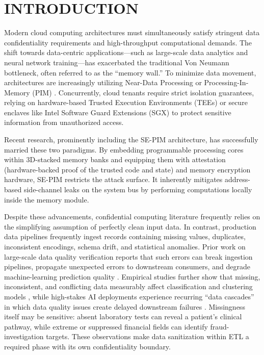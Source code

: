 \documentclass[conference]{IEEEtran}
\begin{document}
\section{INTRODUCTION}
Modern cloud computing architectures must simultaneously satisfy stringent data confidentiality requirements and high-throughput computational demands. The shift towards data-centric applications—such as large-scale data analytics and neural network training—has exacerbated the traditional Von Neumann bottleneck, often referred to as the ``memory wall.'' To minimize data movement, architectures are increasingly utilizing Near-Data Processing or Processing-In-Memory (PIM) \cite{Mutlu:2019}. Concurrently, cloud tenants require strict isolation guarantees, relying on hardware-based Trusted Execution Environments (TEEs) or secure enclaves like Intel Software Guard Extensions (SGX) to protect sensitive information from unauthorized access.

Recent research, prominently including the SE-PIM \cite{Kha:2023} architecture, has successfully married these two paradigms. By embedding programmable processing cores within 3D-stacked memory banks and equipping them with attestation (hardware-backed proof of the trusted code and state) and memory encryption hardware, SE-PIM restricts the attack surface. It inherently mitigates address-based side-channel leaks on the system bus by performing computations locally inside the memory module.

Despite these advancements, confidential computing literature frequently relies on the simplifying assumption of perfectly clean input data. In contrast, production data pipelines frequently ingest records containing missing values, duplicates, inconsistent encodings, schema drift, and statistical anomalies. Prior work on large-scale data quality verification reports that such errors can break ingestion pipelines, propagate unexpected errors to downstream consumers, and degrade machine-learning prediction quality \cite{Schelter:2018}. Empirical studies further show that missing, inconsistent, and conflicting data measurably affect classification and clustering models \cite{Qi:2021}, while high-stakes AI deployments experience recurring ``data cascades'' in which data quality issues create delayed downstream failures \cite{Sambasivan:2021}. Missingness itself may be sensitive: absent laboratory tests can reveal a patient's clinical pathway, while extreme or suppressed financial fields can identify fraud-investigation targets. These observations make data sanitization within ETL a required phase with its own confidentiality boundary.
\end{document}
